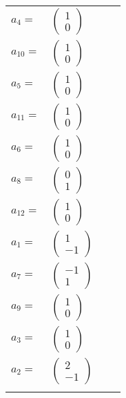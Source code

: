 \documentclass[1p]{elsarticle_modified}
\theoremstyle{definition}
\begin{document}
\begin{tabular}{m{7pt} m{180pt} m{7pt} m{180pt} }
\flushright $a_{4}=$&$\begin{pmatrix}1\\0\end{pmatrix}$ \\
\flushright $a_{10}=$&$\begin{pmatrix}1\\0\end{pmatrix}$ \\
\flushright $a_{5}=$&$\begin{pmatrix}1\\0\end{pmatrix}$ \\
\flushright $a_{11}=$&$\begin{pmatrix}1\\0\end{pmatrix}$ \\
\flushright $a_{6}=$&$\begin{pmatrix}1\\0\end{pmatrix}$ \\
\flushright $a_{8}=$&$\begin{pmatrix}0\\1\end{pmatrix}$ \\
\flushright $a_{12}=$&$\begin{pmatrix}1\\0\end{pmatrix}$ \\
\flushright $a_{1}=$&$\begin{pmatrix}1\\-1\end{pmatrix}$ \\
\flushright $a_{7}=$&$\begin{pmatrix}-1\\1\end{pmatrix}$ \\
\flushright $a_{9}=$&$\begin{pmatrix}1\\0\end{pmatrix}$ \\
\flushright $a_{3}=$&$\begin{pmatrix}1\\0\end{pmatrix}$ \\
\flushright $a_{2}=$&$\begin{pmatrix}2\\-1\end{pmatrix}$\\&\end{tabular}
\end{document}
